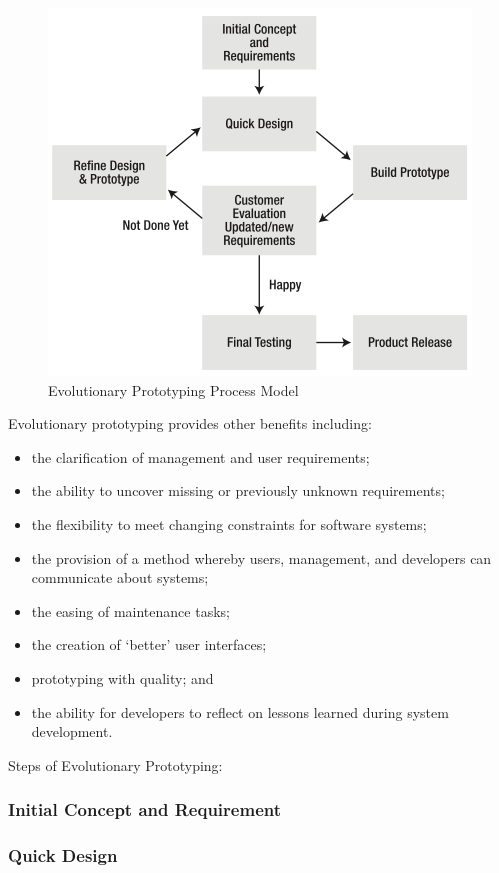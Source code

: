 \documentclass[conference, letterpaper]{IEEEtran}
\begin{document}
\begin{figure}[hbtp]
\centering
\includegraphics[scale=0.5]{image/ep-model.png}
\caption{Evolutionary Prototyping Process Model}
\end{figure}

Evolutionary prototyping provides other benefits including:
\begin{itemize}
\item the clarification of management and user requirements;
\item the ability to uncover missing or previously unknown requirements;
\item the flexibility to meet changing constraints for software systems;
\item the provision of a method whereby users, management, and developers can communicate about systems;
\item the easing of maintenance tasks;
\item the creation of ‘better’ user interfaces;
\item prototyping with quality; and
\item the ability for developers to reflect on lessons learned during system development.
\end{itemize}

Steps of Evolutionary Prototyping:
\subsubsection{Initial Concept and Requirement}

\subsubsection{Quick Design}
\end{document}
